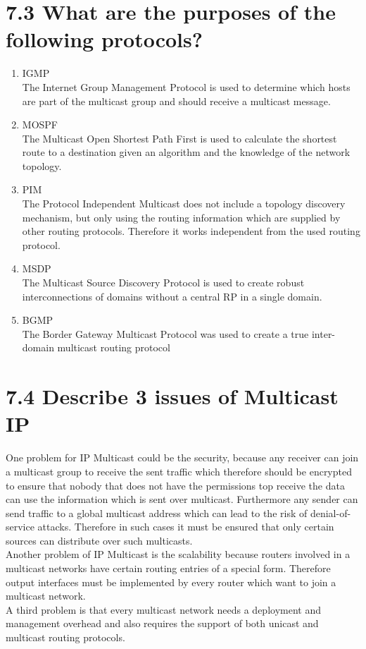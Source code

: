 \documentclass{article}
\begin{document}
	\section*{7.3 What are the purposes of the following protocols?}
	\begin{adjustwidth}{2em}{2em}
		\begin{enumerate}[\small \textbullet]
			\item IGMP \\
			The Internet Group Management Protocol is used to determine which hosts are part of the multicast group and should receive a multicast message.
			\item MOSPF \\
			The Multicast Open Shortest Path First is used to calculate the shortest route to a destination given an algorithm and the knowledge of the network topology.
			\item PIM \\
			The Protocol Independent Multicast does not include a topology discovery mechanism, but only using the routing information which are supplied by other routing protocols. Therefore it works independent from the used routing protocol.
			\item MSDP \\
			The Multicast Source Discovery Protocol is used to create robust interconnections of domains without a central RP in a single domain.
			\item BGMP \\
			The Border Gateway Multicast Protocol was used to create a true inter-domain multicast routing protocol
		\end{enumerate}
	\end{adjustwidth}
	
	\section*{7.4 Describe 3 issues of Multicast IP}
	\begin{adjustwidth}{2em}{2em}
		One problem for IP Multicast could be the security, because any receiver can join a multicast group to receive the sent traffic which therefore should be encrypted to ensure that nobody that does not have the permissions top receive the data can use the information which is sent over multicast. Furthermore any sender can send traffic to a global multicast address which can lead to the risk of denial-of-service attacks. Therefore in such cases it must be ensured that only certain sources can distribute over such multicasts. \\
		Another problem of IP Multicast is the scalability because routers involved in a multicast networks have certain routing entries of a special form. Therefore output interfaces must be implemented by every router which want to join a multicast network. \\
		A third problem is that every multicast network needs a deployment and management overhead and also requires the support of both unicast and multicast routing protocols.
	\end{adjustwidth}
\end{document}
